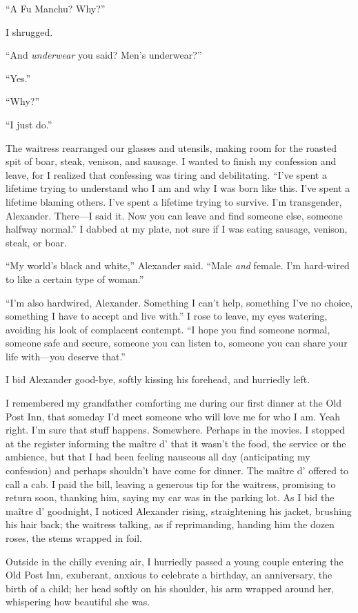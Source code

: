 ``A Fu Manchu? Why?''

I shrugged.

``And \emph{underwear} you said? Men's underwear?''

``Yes.''

``Why?''

``I just do.''

The waitress rearranged our glasses and utensils, making room for the
roasted spit of boar, steak, venison, and sausage. I wanted to finish my
confession and leave, for I realized that confessing was tiring and
debilitating. ``I've spent a lifetime trying to understand who I am and
why I was born like this. I've spent a lifetime blaming others. I've
spent a lifetime trying to survive. I'm transgender, Alexander.
There---I said it. Now you can leave and find someone else, someone
halfway normal.'' I dabbed at my plate, not sure if I was eating
sausage, venison, steak, or boar.

``My world's black and white,'' Alexander said. ``Male \emph{and}
female. I'm hard-wired to like a certain type of woman.''

``I'm also hardwired, Alexander. Something I can't help, something I've
no choice, something I have to accept and live with.'' I rose to leave,
my eyes watering, avoiding his look of complacent contempt. ``I hope you
find someone normal, someone safe and secure, someone you can listen to,
someone you can share your life with---you deserve that.''

I bid Alexander good-bye, softly kissing his forehead, and hurriedly
left.

I remembered my grandfather comforting me during our first dinner at the
Old Post Inn, that someday I'd meet someone who will love me for who I
am. Yeah right. I'm sure that stuff happens. Somewhere. Perhaps in the
movies. I stopped at the register informing the maître d' that it wasn't
the food, the service or the ambience, but that I had been feeling
nauseous all day (anticipating my confession) and perhaps shouldn't have
come for dinner. The maître d' offered to call a cab. I paid the bill,
leaving a generous tip for the waitress, promising to return soon,
thanking him, saying my car was in the parking lot. As I bid the maître
d' goodnight, I noticed Alexander rising, straightening his jacket,
brushing his hair back; the waitress talking, as if reprimanding,
handing him the dozen roses, the stems wrapped in foil.

Outside in the chilly evening air, I hurriedly passed a young couple
entering the Old Post Inn, exuberant, anxious to celebrate a birthday,
an anniversary, the birth of a child; her head softly on his shoulder,
his arm wrapped around her, whispering how beautiful she was.

